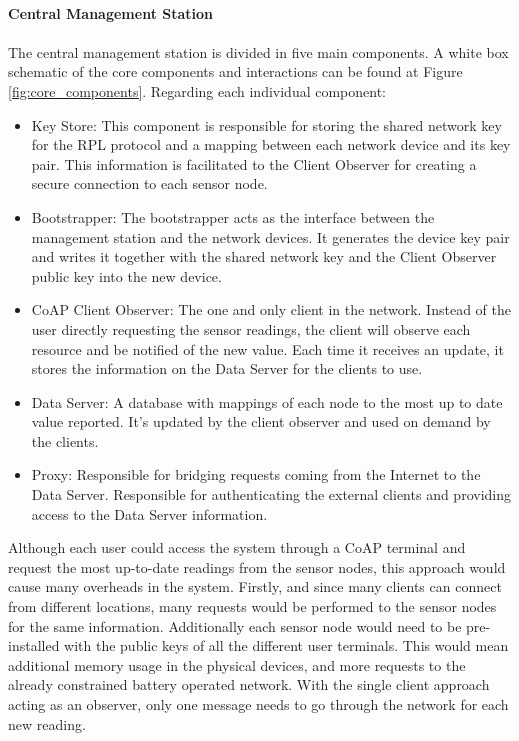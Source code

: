 \paragraph{\textbf{Central Management Station}}
\paragraph{}

The central management station is divided in five main components. A white box schematic of the core components and interactions can be found at Figure \ref{fig:core_components}. Regarding each individual component:

\begin{itemize}
	\item Key Store: This component is responsible for storing the shared network key for the RPL protocol and a mapping between each network device and its key pair. This information is facilitated to the Client Observer for creating a secure connection to each sensor node.\\
	\item Bootstrapper: The bootstrapper acts as the interface between the management station and the network devices. It generates the device key pair and writes it together with the shared network key and the Client Observer public key into the new device.\\
	\item CoAP Client Observer:  The one and only client in the network. Instead of the user directly requesting the sensor readings, the client will observe each resource and be notified of the new value. Each time it receives an update, it stores the information on the Data Server for the clients to use.\\
	\item Data Server: A database with mappings of each node to the most up to date value reported. It's updated by the client observer and used on demand by the clients.\\
	\item Proxy: Responsible for bridging requests coming from the Internet to the Data Server. Responsible for authenticating the external clients and providing access to the Data Server information.\\
\end{itemize}

Although each user could access the system through a \ac{CoAP} terminal and request the most up-to-date readings from the sensor nodes, this approach would cause many overheads in the system. Firstly, and since many clients can connect from different locations, many requests would be performed to the sensor nodes for the same information. Additionally each sensor node would need to be pre-installed with the public keys of all the different user terminals. This would mean additional memory usage in the physical devices, and more requests to the already constrained battery operated network. With the single client approach acting as an observer, only one message needs to go through the network for each new reading.

